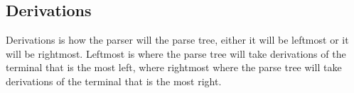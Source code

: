 \subsection{Derivations}
Derivations is how the parser will  the parse tree, either it will be leftmost or it will be rightmost. Leftmost is where the parse tree will take derivations of the terminal that is the most left, where rightmost where the parse tree will take derivations of the terminal that is the most right.